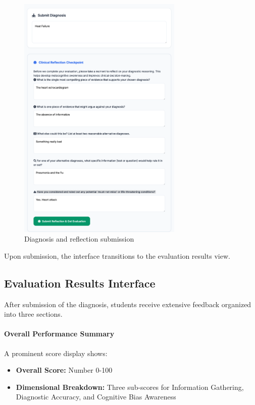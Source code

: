 \begin{figure}[h]
  \centering
  \includegraphics[width=0.7\textwidth]{figures/ui/ui_diagnosis_reflection.png}
  \caption{Diagnosis and reflection submission}
  \label{fig:ui-submission}
\end{figure}

Upon submission, the interface transitions to the evaluation results view.

\subsection{Evaluation Results Interface}
\label{subsec:ui-results}

After submission of the diagnosis, students receive extensive feedback organized into three sections.

\paragraph{Overall Performance Summary}
A prominent score display shows:
\begin{itemize}
  \item \textbf{Overall Score:} Number 0-100
  \item \textbf{Dimensional Breakdown:} Three sub-scores for Information Gathering, Diagnostic Accuracy, and Cognitive Bias Awareness
\end{itemize}

